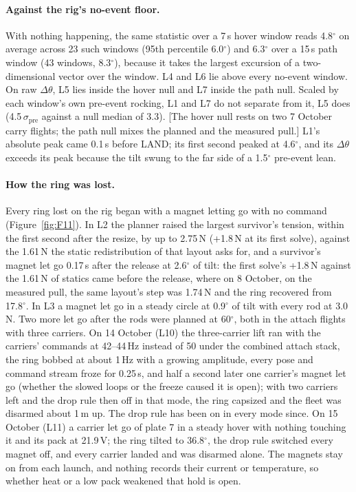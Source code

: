 \paragraph{Against the rig's no-event floor.} With nothing happening, the same statistic over a 7\,s hover window
reads 4.8$^\circ$ on average across 23 such windows (95th percentile 6.0$^\circ$) and 6.3$^\circ$ over a 15\,s path
window (43 windows, 8.3$^\circ$), because it takes the largest excursion of a two-dimensional vector over the window.
L4 and L6 lie above every no-event window. On raw $\Delta\theta$, L5 lies inside the hover null and L7 inside the
path null. Scaled by each window's own pre-event rocking, L1 and L7 do not separate from it, L5 does
(4.5\,$\sigma_\mathrm{pre}$ against a null median of 3.3). [The hover null rests on two 7 October carry flights; the
path null mixes the planned and the measured pull.] L1's absolute peak came 0.1\,s before LAND; its first second
peaked at 4.6$^\circ$, and its $\Delta\theta$ exceeds its peak because the tilt swung to the far side of a
1.5$^\circ$ pre-event lean.

\paragraph{How the ring was lost.} Every ring lost on the rig began with a magnet letting go with no command
(Figure~\ref{fig:F11}). In L2 the planner raised the largest survivor's tension, within the first second after the
resize, by up to 2.75\,N (+1.8\,N at its first solve), against the 1.61\,N the static redistribution of that layout
asks for, and a survivor's magnet let go 0.17\,s after the release at 2.6$^\circ$ of tilt: the first solve's +1.8\,N against the 1.61\,N of statics came before the release, where on 8 October, on
the measured pull, the same layout's step was 1.74\,N and the ring recovered from 17.8$^\circ$. In L3 a magnet let go
in a steady circle at 0.9$^\circ$ of tilt with every rod at 3.0\,N. Two more let go after the rods were planned at
60$^\circ$, both in the attach flights with three carriers. On 14 October (L10) the three-carrier lift ran with the
carriers' commands at 42--44\,Hz instead of 50 under the combined attach stack, the ring bobbed at about 1\,Hz with a
growing amplitude, every pose and command stream froze for 0.25\,s, and half a second later one carrier's magnet let
go (whether the slowed loops or the freeze caused it is open); with two carriers left and the drop rule then
off in that mode, the ring capsized and the fleet was disarmed about 1\,m up. The drop rule has been on in every mode
since. On 15 October (L11) a carrier let go of plate 7 in a steady hover with nothing touching it and its pack at
21.9\,V; the ring tilted to 36.8$^\circ$, the drop rule switched every magnet off, and every carrier landed and was
disarmed alone. The magnets stay on from each launch, and nothing records their current or temperature, so whether
heat or a low pack weakened that hold is open.

